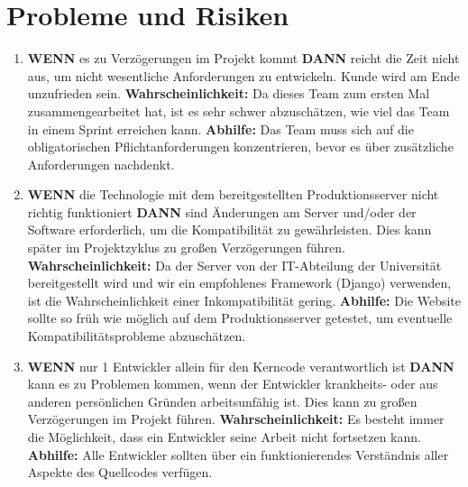 \section{Probleme und Risiken}
\begin{enumerate}
	\item
    \textbf{WENN} es zu Verzögerungen im Projekt kommt \textbf{DANN} reicht die Zeit nicht aus, um nicht wesentliche Anforderungen zu entwickeln. Kunde wird am Ende unzufrieden sein.
    \linebreak
    \linebreak
    \textbf{Wahrscheinlichkeit:}  Da dieses Team zum ersten Mal zusammengearbeitet hat, ist es sehr schwer abzuschätzen, wie viel das Team in einem Sprint erreichen kann.
    \linebreak
    \linebreak
    \textbf{Abhilfe:} Das Team muss sich auf die obligatorischen Pflichtanforderungen konzentrieren, bevor es über zusätzliche Anforderungen nachdenkt.
    \linebreak

    \item
    \textbf{WENN} die Technologie mit dem bereitgestellten Produktionsserver nicht richtig funktioniert \textbf{DANN} sind Änderungen am Server und/oder der Software erforderlich, um die Kompatibilität zu gewährleisten. Dies kann später im Projektzyklus zu großen Verzögerungen führen.
    \linebreak
    \linebreak
    \textbf{Wahrscheinlichkeit:} Da der Server von der IT-Abteilung der Universität bereitgestellt wird und wir ein empfohlenes Framework (Django) verwenden, ist die Wahrscheinlichkeit einer Inkompatibilität gering.
    \linebreak
    \linebreak
    \textbf{Abhilfe:} Die Website sollte so früh wie möglich auf dem Produktionsserver getestet, um eventuelle Kompatibilitätsprobleme abzuschätzen.
    \linebreak
    
    \item
    \textbf{WENN} nur 1 Entwickler allein für den Kerncode verantwortlich ist \textbf{DANN} kann es zu Problemen kommen, wenn der Entwickler krankheits- oder aus anderen persönlichen Gründen arbeitsunfähig ist. Dies kann zu großen Verzögerungen im Projekt führen.
    \linebreak
    \linebreak
    \textbf{Wahrscheinlichkeit:} Es besteht immer die Möglichkeit, dass ein Entwickler seine Arbeit nicht fortsetzen kann.
    \linebreak
    \linebreak
    \textbf{Abhilfe:} Alle Entwickler sollten über ein funktionierendes Verständnis aller Aspekte des Quellcodes verfügen.
    \linebreak


\end{enumerate}
